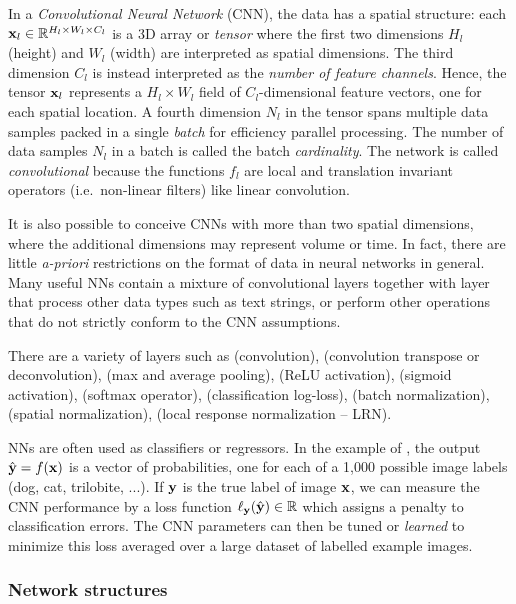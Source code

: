 In a \emph{Convolutional Neural Network} (CNN), the data has a spatial structure: each $\mathbf{x}_l\in\mathbb{R}^{H_l \times W_l \times C_l}$ is a 3D array or \emph{tensor} where the first two dimensions $H_l$ (height) and $W_l$ (width) are interpreted as spatial dimensions. The third dimension $C_l$ is instead interpreted as the \emph{number of feature channels}. Hence, the tensor $\mathbf{x}_l$ represents a $H_l \times W_l$ field of $C_l$-dimensional feature vectors, one for each spatial location. A fourth dimension $N_l$ in the tensor spans multiple data samples packed in a single \emph{batch} for efficiency parallel processing. The number of data samples $N_l$ in a batch is called the batch \emph{cardinality}. The network is called \emph{convolutional} because the functions $f_l$ are local and translation invariant operators (i.e.\ non-linear filters) like linear convolution.

It is also possible to conceive CNNs with more than two spatial dimensions, where the additional dimensions may represent volume or time. In fact, there are little \emph{a-priori} restrictions on the format of data in neural networks in general. Many useful NNs contain a mixture of convolutional layers together with layer that process other data types such as text strings, or perform other operations that do not strictly conform  to the CNN assumptions.

There are a variety of layers such as (convolution),  (convolution transpose or deconvolution),  (max and average pooling),  (ReLU activation),  (sigmoid activation),  (softmax operator),  (classification log-loss), (batch normalization), (spatial normalization), (local response normalization -- LRN). 

NNs are often used as classifiers or regressors. In the example of , the output $\hat {\mathbf{y}} = f(\mathbf{x})$ is a vector of probabilities, one for each of a 1,000 possible image labels (dog, cat, trilobite, ...).  If $\mathbf{y}$ is the true label of image $\mathbf{x}$, we can measure the CNN performance by a loss function $\ell_{\mathbf{y}}(\hat {\mathbf{y}})  \in \mathbb{R}$ which assigns a penalty to classification errors. The CNN parameters can then be tuned or \emph{learned} to minimize this loss averaged over a large dataset of labelled example images.


\subsubsection{Network structures}\label{s:cnn-topology}

